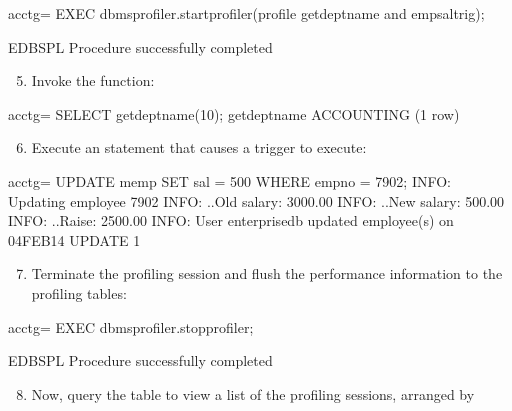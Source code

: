 \documentclass[letterpaper,10pt,english,openany,oneside]{sphinxmanual}
\begin{document}
%
\begin{sphinxVerbatim}[commandchars=\\\{\}]
acctg=\PYGZsh{} EXEC dbms\PYGZus{}profiler.start\PYGZus{}profiler(\PYGZsq{}profile get\PYGZus{}dept\PYGZus{}name and
emp\PYGZus{}sal\PYGZus{}trig\PYGZsq{});

EDB\PYGZhy{}SPL Procedure successfully completed
\end{sphinxVerbatim}

\newpage
\begin{enumerate}
\setcounter{enumi}{4}
\item {} 
Invoke the  function:

\end{enumerate}

%
\begin{sphinxVerbatim}[commandchars=\\\{\}]
acctg=\PYGZsh{} SELECT get\PYGZus{}dept\PYGZus{}name(10);
 get\PYGZus{}dept\PYGZus{}name
\PYGZhy{}\PYGZhy{}\PYGZhy{}\PYGZhy{}\PYGZhy{}\PYGZhy{}\PYGZhy{}\PYGZhy{}\PYGZhy{}\PYGZhy{}\PYGZhy{}\PYGZhy{}\PYGZhy{}\PYGZhy{}\PYGZhy{}
 ACCOUNTING
(1 row)
\end{sphinxVerbatim}
\begin{enumerate}
\setcounter{enumi}{5}
\item {} 
Execute an  statement that causes a trigger to execute:

\end{enumerate}

%
\begin{sphinxVerbatim}[commandchars=\\\{\}]
acctg=\PYGZsh{} UPDATE memp SET sal = 500 WHERE empno = 7902;
INFO: Updating employee 7902
INFO: ..Old salary: 3000.00
INFO: ..New salary: 500.00
INFO: ..Raise: \PYGZhy{}2500.00
INFO: User enterprisedb updated employee(s) on 04\PYGZhy{}FEB\PYGZhy{}14
UPDATE 1
\end{sphinxVerbatim}
\begin{enumerate}
\setcounter{enumi}{6}
\item {} 
Terminate the profiling session and flush the performance information
to the profiling tables:

\end{enumerate}

%
\begin{sphinxVerbatim}[commandchars=\\\{\}]
acctg=\PYGZsh{} EXEC dbms\PYGZus{}profiler.stop\PYGZus{}profiler;

EDB\PYGZhy{}SPL Procedure successfully completed
\end{sphinxVerbatim}
\begin{enumerate}
\setcounter{enumi}{7}
\item {} 
Now, query the  table to view a list of the
profiling sessions, arranged by 

\end{enumerate}
\end{document}
